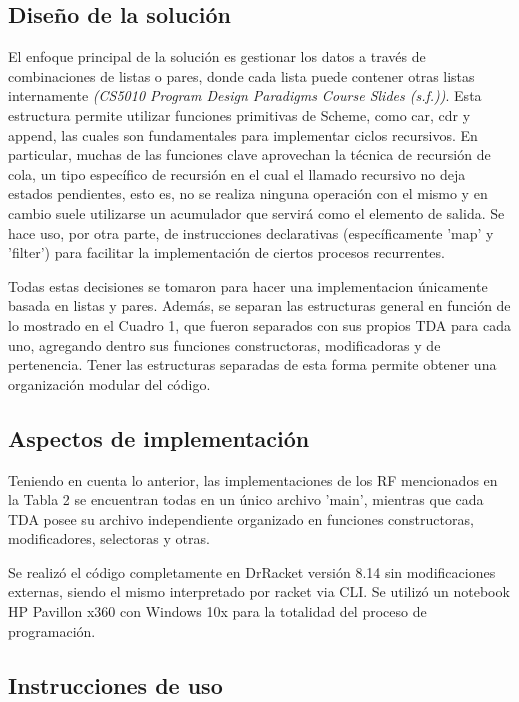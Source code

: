 \documentclass[12pt]{article}
\begin{document}
    \subsection{Diseño de la solución}
    
    El enfoque principal de la solución es gestionar los datos a través de combinaciones de listas o pares, donde cada lista puede contener otras listas internamente \textit{(CS5010 Program Design Paradigms Course Slides (s.f.))}. Esta estructura permite utilizar funciones primitivas de Scheme, como car, cdr y append, las cuales son fundamentales para implementar ciclos recursivos. En particular, muchas de las funciones clave aprovechan la técnica de recursión de cola, un tipo específico de recursión en el cual el llamado recursivo no deja estados pendientes, esto es, no se realiza ninguna operación con el mismo y en cambio suele utilizarse un acumulador que servirá como el elemento de salida. Se hace uso, por otra parte, de instrucciones declarativas (específicamente 'map' y 'filter') para facilitar la implementación de ciertos procesos recurrentes.
    
    Todas estas decisiones se tomaron para hacer una implementacion únicamente basada en listas y pares.
    Además, se separan las estructuras general en función de lo mostrado en el Cuadro 1, que fueron separados con
    sus propios TDA para cada uno, agregando dentro sus funciones constructoras, modificadoras y de pertenencia.
    Tener las estructuras separadas de esta forma permite obtener una organización modular del código.
    
    \subsection{Aspectos de implementación}
    
    Teniendo en cuenta lo anterior, las implementaciones de los RF mencionados en la Tabla 2 se encuentran todas en un único archivo 'main', mientras que cada TDA posee su archivo independiente organizado en  funciones constructoras, modificadores, selectoras y otras.
    
    Se realizó el código completamente en DrRacket versión 8.14 sin modificaciones externas, siendo el mismo interpretado por racket via CLI. Se utilizó un notebook HP Pavillon x360 con Windows 10x para la totalidad del proceso de programación.
    
    \subsection{Instrucciones de uso}
    
\end{document}
